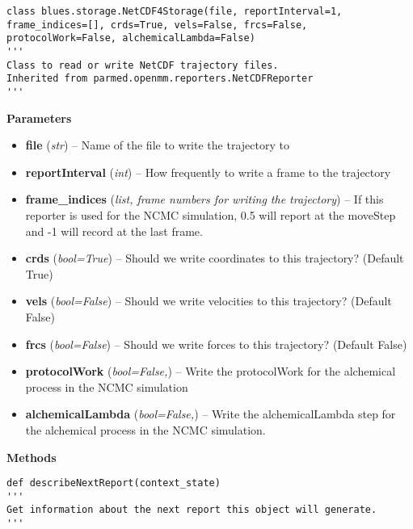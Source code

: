 \begin{description}
\begin{verbatim}
class blues.storage.NetCDF4Storage(file, reportInterval=1, frame_indices=[], crds=True, vels=False, frcs=False, protocolWork=False, alchemicalLambda=False)
'''
Class to read or write NetCDF trajectory files.
Inherited from parmed.openmm.reporters.NetCDFReporter
'''
\end{verbatim}

\begin{description}
\item
    \textbf{Parameters}
\begin{itemize}
\item
  \textbf{file} (\emph{str}) -- Name of the file to write the trajectory
  to
\item
  \textbf{reportInterval} (\emph{int}) -- How frequently to write a
  frame to the trajectory
\item
  \textbf{frame\_indices} (\emph{list, frame numbers for writing the
  trajectory}) -- If this reporter is used for the NCMC simulation, 0.5
  will report at the moveStep and -1 will record at the last frame.
\item
  \textbf{crds} (\emph{bool=True}) -- Should we write coordinates to
  this trajectory? (Default True)
\item
  \textbf{vels} (\emph{bool=False}) -- Should we write velocities to
  this trajectory? (Default False)
\item
  \textbf{frcs} (\emph{bool=False}) -- Should we write forces to this
  trajectory? (Default False)
\item
  \textbf{protocolWork} (\emph{bool=False,}) -- Write the protocolWork
  for the alchemical process in the NCMC simulation
\item
  \textbf{alchemicalLambda} (\emph{bool=False,}) -- Write the
  alchemicalLambda step for the alchemical process in the NCMC
  simulation.
\end{itemize}
\end{description}

\begin{description}
\item
    \textbf{Methods}
    
\begin{verbatim}
def describeNextReport(context_state)
'''
Get information about the next report this object will generate.
'''
\end{verbatim}


\end{description}
\end{description}
